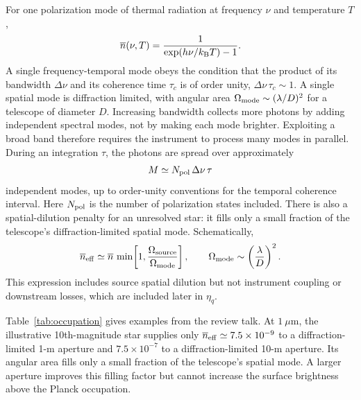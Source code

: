 \documentclass[]{spie}
\newcommand{\nbar}{\overline{n}}
\begin{document}
For one polarization mode of thermal radiation at frequency $\nu$ and temperature $T$,
\begin{equation}
    \nbar(\nu,T)=\frac{1}{\exp(h\nu/k_{\rm B}T)-1}.
    \label{eq:occupation}
\end{equation}
A single frequency-temporal mode obeys the condition that the product of its bandwidth $\Delta\nu$ and its coherence time $\tau_c$ is of order unity, $\Delta\nu\,\tau_c\sim1$. A single spatial mode is diffraction limited, with angular area $\Omega_{\rm mode}\sim(\lambda/D)^2$ for a telescope of diameter $D$.
Increasing bandwidth collects more photons by adding independent spectral modes, not by making each mode brighter. Exploiting a broad band therefore requires the instrument to process many modes in parallel. During an integration $\tau$, the photons are spread over approximately
\begin{equation}
    M \simeq N_{\rm pol}\,\Delta\nu\,\tau
    \label{eq:modes}
\end{equation}
independent modes, up to order-unity conventions for the temporal coherence interval. Here $N_{\rm pol}$ is the number of polarization states included. There is also a spatial-dilution penalty for an unresolved star: it fills only a small fraction of the telescope's diffraction-limited spatial mode. Schematically,
\begin{equation}
    \nbar_{\rm eff}\simeq \nbar\,
    \min\!\left[1,\frac{\Omega_{\rm source}}{\Omega_{\rm mode}}\right],
    \qquad \Omega_{\rm mode}\sim\left(\frac{\lambda}{D}\right)^2.
    \label{eq:effectiveoccupation}
\end{equation}
This expression includes source spatial dilution but not instrument coupling or downstream losses, which are included later in $\eta_q$.


Table~\ref{tab:occupation} gives examples from the review talk. At $1~\mu$m, the illustrative 10th-magnitude star supplies only $\nbar_{\rm eff}\simeq7.5\times10^{-9}$ to a diffraction-limited 1-m aperture and $7.5\times10^{-7}$ to a diffraction-limited 10-m aperture. Its angular area fills only a small fraction of the telescope's spatial mode. A larger aperture improves this filling factor but cannot increase the surface brightness above the Planck occupation.
\end{document}
